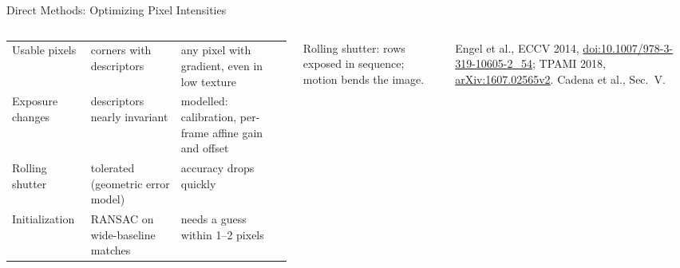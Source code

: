 \begin{frame}{Direct Methods: Optimizing Pixel Intensities}
\begin{columns}[T,onlytextwidth]
{\begin{tabular}{>{\raggedright\arraybackslash}p{1.45cm} >{\raggedright\arraybackslash}p{2.5cm} >{\raggedright\arraybackslash}p{2.85cm}}
        \midrule
        Usable pixels & corners with descriptors & any pixel with gradient, even in low texture \\
        \addlinespace[0.1em]
        Exposure changes & descriptors nearly invariant & modelled: calibration, per-frame affine gain and offset \\
        \addlinespace[0.1em]
        Rolling shutter & tolerated (geometric error model) & accuracy drops quickly \\
        \addlinespace[0.1em]
        Initialization & RANSAC on wide-baseline matches & needs a guess within 1--2 pixels \\
        \bottomrule
      \end{tabular}\par}
      \vspace{0.1em}
      {\scriptsize Rolling shutter: rows exposed in sequence; motion bends the image.\par}
      \vspace{0.2em}
      {\scriptsize Engel et al., ECCV 2014, \href{https://doi.org/10.1007/978-3-319-10605-2_54}{doi:10.1007/978-3-319-10605-2\_54}; TPAMI 2018, \href{https://arxiv.org/abs/1607.02565v2}{arXiv:1607.02565v2}. Cadena et al., Sec.~V.\par}
  \end{columns}
\end{frame}

